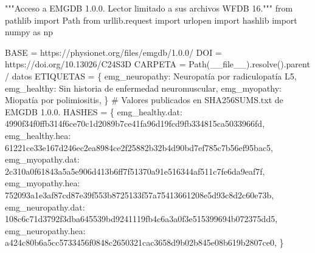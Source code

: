 \documentclass[
  spanish,
  10.5pt,
  a4paper,
  DIV=11,
  numbers=noendperiod]{scrartcl}
\newenvironment{Shaded}{\begin{snugshade}}{\end{snugshade}}
\newcommand{\CommentTok}[1]{\textcolor[rgb]{0.37,0.37,0.37}{#1}}
\newcommand{\ImportTok}[1]{\textcolor[rgb]{0.00,0.46,0.62}{#1}}
\newcommand{\NormalTok}[1]{\textcolor[rgb]{0.00,0.23,0.31}{#1}}
\newcommand{\OperatorTok}[1]{\textcolor[rgb]{0.37,0.37,0.37}{#1}}
\newcommand{\StringTok}[1]{\textcolor[rgb]{0.13,0.47,0.30}{#1}}
\newcommand{\VariableTok}[1]{\textcolor[rgb]{0.07,0.07,0.07}{#1}}
\begin{document}
\begin{Shaded}
\begin{Highlighting}[]
\CommentTok{"""Acceso a EMGDB 1.0.0. Lector limitado a sus archivos WFDB 16."""}
\ImportTok{from}\NormalTok{ pathlib }\ImportTok{import}\NormalTok{ Path}
\ImportTok{from}\NormalTok{ urllib.request }\ImportTok{import}\NormalTok{ urlopen}
\ImportTok{import}\NormalTok{ hashlib}
\ImportTok{import}\NormalTok{ numpy }\ImportTok{as}\NormalTok{ np}

\NormalTok{BASE }\OperatorTok{=} \StringTok{\textquotesingle{}https://physionet.org/files/emgdb/1.0.0/\textquotesingle{}}
\NormalTok{DOI }\OperatorTok{=} \StringTok{\textquotesingle{}https://doi.org/10.13026/C24S3D\textquotesingle{}}
\NormalTok{CARPETA }\OperatorTok{=}\NormalTok{ Path(}\VariableTok{\_\_file\_\_}\NormalTok{).resolve().parent }\OperatorTok{/} \StringTok{\textquotesingle{}datos\textquotesingle{}}
\NormalTok{ETIQUETAS }\OperatorTok{=}\NormalTok{ \{}
    \StringTok{\textquotesingle{}emg\_neuropathy\textquotesingle{}}\NormalTok{: }\StringTok{\textquotesingle{}Neuropatía por radiculopatía L5\textquotesingle{}}\NormalTok{,}
    \StringTok{\textquotesingle{}emg\_healthy\textquotesingle{}}\NormalTok{: }\StringTok{\textquotesingle{}Sin historia de enfermedad neuromuscular\textquotesingle{}}\NormalTok{,}
    \StringTok{\textquotesingle{}emg\_myopathy\textquotesingle{}}\NormalTok{: }\StringTok{\textquotesingle{}Miopatía por polimiositis\textquotesingle{}}\NormalTok{,}
\NormalTok{\}}
\CommentTok{\# Valores publicados en SHA256SUMS.txt de EMGDB 1.0.0.}
\NormalTok{HASHES }\OperatorTok{=}\NormalTok{ \{}
 \StringTok{\textquotesingle{}emg\_healthy.dat\textquotesingle{}}\NormalTok{:}
 \StringTok{\textquotesingle{}4990f34f0ffb314f6ce70c1d2089b7ce41fa96d19fcd9fb334815ca5033966fd\textquotesingle{}}\NormalTok{,}
 \StringTok{\textquotesingle{}emg\_healthy.hea\textquotesingle{}}\NormalTok{:}
 \StringTok{\textquotesingle{}61221ce33e167d246ec2ea8984ce2f25882b32b4d90bd7ef785c7b56ef95bac5\textquotesingle{}}\NormalTok{,}
 \StringTok{\textquotesingle{}emg\_myopathy.dat\textquotesingle{}}\NormalTok{:}
 \StringTok{\textquotesingle{}2c310a0f61843a5a5e906d413b6ff7f51370a91e516344af511c7fe6da9eaf7f\textquotesingle{}}\NormalTok{,}
 \StringTok{\textquotesingle{}emg\_myopathy.hea\textquotesingle{}}\NormalTok{:}
 \StringTok{\textquotesingle{}752093a1e3af87cd87e39f553b8725133f57a75413661208e5d93c8d2c60e73b\textquotesingle{}}\NormalTok{,}
 \StringTok{\textquotesingle{}emg\_neuropathy.dat\textquotesingle{}}\NormalTok{:}
 \StringTok{\textquotesingle{}108c6c71d3792f3dba645539bd9241119fb4c6a3a0f3e515399694b072375dd5\textquotesingle{}}\NormalTok{,}
 \StringTok{\textquotesingle{}emg\_neuropathy.hea\textquotesingle{}}\NormalTok{:}
 \StringTok{\textquotesingle{}a424c80b6a5cc5733456f0848c2650321cac3658d9b02b845e08b619b2807ce0\textquotesingle{}}\NormalTok{,}
\NormalTok{\}}
\end{Highlighting}
\end{Shaded}
\end{document}
